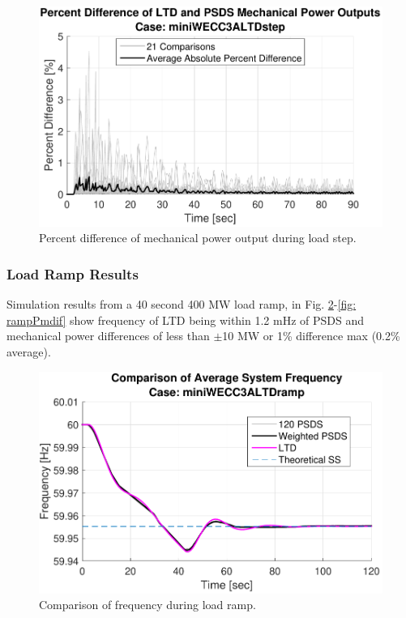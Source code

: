 \begin{figure}[!ht]
	\centering
	\includegraphics[width=\linewidth]{figures/miniWECC3ALTDstepPm3}
	\caption{Percent difference of mechanical power output during load step.}
	\label{fig: stepPmPercentdif}
\end{figure}


\subsubsection{Load Ramp Results}
Simulation results from a 40 second 400 MW load ramp, in Fig. \ref{fig: rampFcomp}-\ref{fig: rampPmdif} show frequency of LTD being within 1.2 mHz of PSDS and mechanical power differences of less than $\pm$10 MW or 1\% difference max (0.2\% average).

\begin{figure}[!ht]
	\centering
	\includegraphics[width=\linewidth]{figures/miniWECC3ALTDrampF3}
	\caption{Comparison of frequency during load ramp.}
	\label{fig: rampFcomp}
\end{figure}

